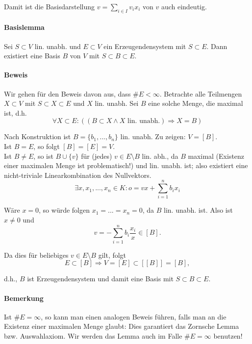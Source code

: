 	Damit ist die Basisdarstellung $v = \sum_{i\in I} v_ix_i$ von $ v $ auch eindeutig.


\paragraph{Basislemma}
    Sei $S\subset V$ lin. unabh. und $E\subset V$ ein Erzeugendensystem mit $S\subset E$. Dann existiert eine Basis $B$ von $V$ mit $S\subset B\subset E$.

\paragraph{Beweis}
    Wir gehen für den Beweis davon aus, dass $\#E<\infty$. Betrachte alle Teilmengen $X\subset V$ mit $S\subset X\subset E$ und $X$ lin. unabh. Sei $B$ eine solche Menge, die maximal ist, d.h.
    \begin{equation*}
        \forall X\subset E: ((B\subset X\land X\text{ lin. unabh.}) \Rightarrow X= B)
    \end{equation*}
    
    Nach Konstruktion ist $B=\{b_1,...,b_n\}$ lin. unabh. Zu zeigen: $V=[B]$.\\
    Ist $B=E$, so folgt $[B]=[E]=V$.\\
    Ist $B\neq E$, so ist $B\cup \{v\} $ für (jedes) $v\in E\setminus B$ lin. abh., da $B$ maximal (Existenz einer maximalen Menge ist problematisch!) und lin. unabh. ist; also existiert eine nicht-triviale Linearkombination des Nullvektors.
    \begin{equation*}
    \exists x,x_1,...,x_n \in K: o=vx+\sum^n_{i=1}b_ix_i
    \end{equation*}

    Wäre $x=0$, so würde folgen $x_1=...=x_n=0$, da $B$ lin. unabh. ist. 
    Also ist $x\neq 0$ und 
    \begin{equation*}
    	v=-\sum^n_{i=1} b_i\frac{x_i}{x} \in [B].
    \end{equation*}
    
    Da dies für beliebiges $v\in E\setminus B$ gilt, folgt
    \begin{equation*}
    	E\subset [B] \Rightarrow V=[E]\subset [[B]] = [B],
    \end{equation*}
    
    d.h., $ B $ ist Erzeugendensystem und damit eine Basis mit $S\subset B\subset E$.

\paragraph{Bemerkung}
    Ist $\#E = \infty$, so kann man einen analogen Beweis führen, falls man an die Existenz einer maximalen Menge glaubt: Dies garantiert das Zornsche Lemma bzw. Auswahlaxiom.
    Wir werden das Lemma auch im Falle $\#E = \infty$ benutzen!

